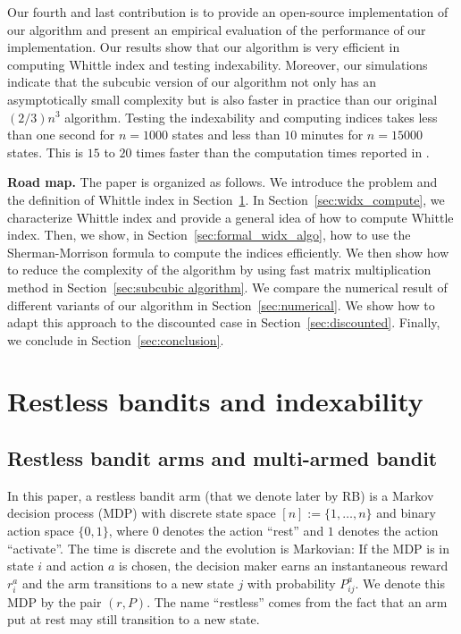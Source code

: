 Our fourth and last contribution is to provide an open-source implementation of our algorithm and present an empirical evaluation of the performance of our implementation. Our results show that our algorithm is very efficient in computing Whittle index and testing indexability. Moreover, our simulations indicate that the subcubic version of our algorithm not only has an asymptotically small complexity but is also faster in practice than our original $(2/3)n^3$ algorithm. Testing the indexability and computing indices takes less than one second for $n=1000$ states and less than $10$ minutes for $n=15000$ states. This is $15$ to $20$ times faster than the computation times reported in \cite{nino2020fast}.
\medskip

\textbf{Road map.}
The paper is organized as follows. We introduce the problem and the definition of Whittle index in Section~\ref{sec:bandits}. In Section~\ref{sec:widx_compute}, we characterize Whittle index and provide a general idea of how to compute Whittle index. Then, we show, in Section~\ref{sec:formal_widx_algo}, how to use the Sherman-Morrison formula to compute the indices efficiently. We then show how to reduce the complexity of the algorithm by using fast matrix multiplication method in Section~\ref{sec:subcubic algorithm}. We compare the numerical result of different variants of our algorithm in Section~\ref{sec:numerical}. We show how to adapt this approach to the discounted case in Section~\ref{sec:discounted}.  Finally, we conclude in Section~\ref{sec:conclusion}.

\section{Restless bandits and indexability}
\label{sec:bandits}

\subsection{Restless bandit arms and multi-armed bandit}
\label{ssec:def}

In this paper, a restless bandit arm (that we denote later by RB) is a Markov decision process (MDP) with discrete state space $[n]:=\{1,\dots, n\}$ and binary action space $\{0, 1\}$, where $0$ denotes the action ``rest'' and $1$ denotes the action ``activate''. The time is discrete and the evolution is Markovian: If the MDP is in state $i$ and action $a$ is chosen, the decision maker earns an instantaneous reward ${r}^a_i$ and the arm transitions to a new state $j$ with probability ${P}^a_{ij}$. We denote this MDP by the pair $(r,P)$.  The name ``restless'' comes from the fact that an arm put at rest may still transition to a new state. 

